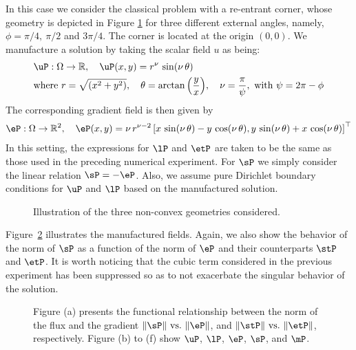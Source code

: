 In this case we consider the classical problem with a re-entrant corner, whose geometry is depicted in 
Figure \ref{fig:geometries_non_convex} for three different external angles, namely, $\phi =\pi/4,~\pi/2$ and $3\pi/4$. The corner is located at the origin $(0, 0)$. 
We manufacture a solution by taking the scalar field $u$ as being:
\begin{equation*}
	\begin{aligned}
	&\uP: \Omega \rightarrow \mathbb{R}, \quad \uP(x,y) = r^{\nu}\,\sin(\nu\,\theta) \\
	&\mbox{where}~r = \sqrt{\left(x^{2}+y^{2}\right)}, \quad \theta = \arctan{\left(\frac{y}{x}\right)}, \quad  \nu = \frac{\pi}{\psi},~\mbox{with}~\psi = 2\pi-\phi
	\end{aligned}
\end{equation*}
The corresponding gradient field is then given by
\begin{equation*}
	\begin{aligned}
	\eP: \Omega \rightarrow \mathbb{R}^{2}, \quad \eP(x,y) = \nu\,r^{\nu-2}\left[x\,\sin(\nu\,\theta)-y\,\cos(\nu\,\theta),y\,\sin(\nu\,\theta)+x\,\cos(\nu\,\theta)\right]^{\top}
	\end{aligned}
\end{equation*}
In this setting, the expressions for $\lP$ and $\etP$ are taken to be the same as those used in the preceding numerical experiment. For $\sP$ we simply consider the linear relation $\sP = -\eP$.
Also, we assume pure Dirichlet boundary conditions for $\uP$ and $\lP$ based on the manufactured solution.
\begin{figure}[h!]
	\centering
	\caption{Illustration of the three non-convex geometries considered.}
	\fontsize{11pt}{10pt}\selectfont 
	\def\svgwidth{1.0\columnwidth}
	
	\label{fig:geometries_non_convex}
\end{figure}
Figure~\ref{fig:all_fields_ref_non_convex} illustrates the manufactured fields. Again, we also show the behavior of the norm of $\sP$ as a function of the norm of  $\eP$ and their counterparts $ \stP$ and $\etP $.
It is worth noticing that the cubic term considered in the previous experiment has been suppressed so as to not exacerbate the singular behavior of the solution.
\begin{figure}[h!]
	\centering
	\caption{Figure (a) presents the functional relationship between the norm of the flux and the gradient $\|\sP\|~\mbox{vs.}~\|\eP\|$, and $\|\stP\|~\mbox{vs.}~\|\etP\|$, respectively. Figure (b) to (f) show $\uP$, $\lP$, $\eP$, $\sP$, and $\mP$.}
	\def\svgwidth{1.0\columnwidth}
	
	\label{fig:all_fields_ref_non_convex}
\end{figure}
